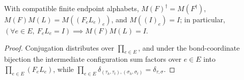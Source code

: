 \begin{lemma}%
    \label{thm:peps_oriented_bond_family_algebra}
    \leanok
    With compatible finite endpoint alphabets,
    $M(F)^\dagger=M(F^\dagger)$,
    $M(F)M(L)=M((F_eL_e)_e)$, and $M((I)_e)=I$; in particular,
    $(\forall e\in E,\ F_eL_e=I)\implies M(F)M(L)=I$.
\end{lemma}
\begin{proof}\leanok
    Conjugation distributes over $\prod_{e\in E}$, and under the bond-coordinate
    bijection the intermediate configuration sum factors over $e\in E$ into
    $\prod_{e\in E}(F_eL_e)$, while $\prod_{e\in E}\delta_{(\tau_h,\tau_t),(\sigma_h,\sigma_t)}=\delta_{\tau,\sigma}$.
\end{proof}
